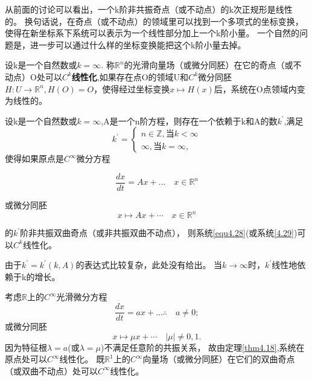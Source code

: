 从前面的讨论可以看出，一个k阶非共振奇点（或不动点）的k次正规形是线性的。
换句话说，在奇点（或不动点）的领域里可以找到一个多项式的坐标变换，使得在新坐标系下系统可以表示为一个线性部分加上一个k阶小量。
一个自然的问题是，进一步可以通过什么样的坐标变换能把这个k阶小量去掉。

\begin{defination}
  设k是一个自然数或\(k=\infty\).
  称\(\mathbb{R}^n\)的光滑向量场（或微分同胚）在它的奇点（或不动点）O处可以\(C^k\)\textbf{线性化},如果存在点O的领域U和\(C^k\)微分同胚$H : U \rightarrow \mathbb { R } ^ { n } , H ( O ) = O$，使得经过坐标变换$x \mapsto H ( x )$后，系统在O点领域内变为线性的。
\end{defination}

\begin{theorem}[IY]
  设k是一个自然数或\(k=\infty\),A是一个n阶方程，则存在一个依赖于k和A的数\(k^{\prime}\),满足
  \[
    k ^ { \prime } =
    \left\{
      \begin{array} { l }
        { n \in \mathbb { Z } } ,当k < \infty\\
        { \infty },当k= \infty,
      \end{array}
    \right.
  \]
  使得如果原点是\(C^\infty\)微分方程
  
\begin{equation}
\frac { d x } { d t } = A x + \dots \quad x \in \mathbb{R}^{n}
\label{eq:1.4.28}
\end{equation}

  或微分同胚
  \begin{equation}
x \mapsto A x + \cdots \quad x \in \mathbb { R } ^ { n }
    \label{eq:1.4.29}
  \end{equation}
  
  的\(k^\prime\)阶非共振双曲奇点（或非共振双曲不动点），
  则系统\ref{equ4.28}(或系统\ref{4.29})可以\(C^k\)线性化。  
\end{theorem}

\begin{note}
  由于$k ^ { \prime } = k ^ { \prime } ( k , A )$的表达式比较复杂，此处没有给出。
  当\(k\to \infty\)时，\(k^\prime\)线性地依赖于k的增长。
\end{note}

\begin{example}
  考虑\(\mathbb{R}\)上的\(C^\infty\)光滑微分方程
  \[
  \frac { d x } { d t } = a x + \dots \therefore \quad a \neq 0;
\]
或微分同胚
\[
x \mapsto \mu x + \cdots \quad | \mu | \neq 0,1.
\]
因为特征根\(\lambda=a\)(或\(\lambda=\mu\))不满足任意阶的共振关系，
故由定理\ref{thm4.18},系统在原点处可以\(C^\infty\)线性化。
既\(\mathbb{R}^1\)上的\(C^\infty\)向量场（或微分同胚）在它们的双曲奇点（或双曲不动点）处可以\(C^\infty\)线性化。
\end{example}

